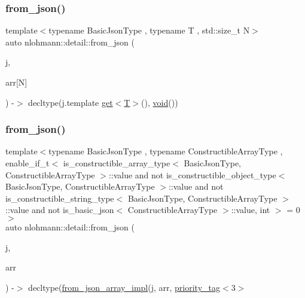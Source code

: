 \mbox{\label{namespacenlohmann_1_1detail_a7deb2db8eed6f1762373dde7a6595760}} 
\subsubsection{\texorpdfstring{from\_json()}{from\_json()}\hspace{0.1cm}{\footnotesize\ttfamily [11/18]}}
{\footnotesize\ttfamily template$<$typename Basic\+Json\+Type , typename T , std\+::size\+\_\+t N$>$ \\
auto nlohmann\+::detail\+::from\+\_\+json (\begin{DoxyParamCaption}\item[{const Basic\+Json\+Type \&}]{j,  }\item[{\mbox{\hyperlink{_keyboard_event_8h_adf1f3edb9115acb0a1e04209b7a9937b}{T}}(\&)}]{arr\mbox{[}\+N\mbox{]} }\end{DoxyParamCaption}) -\/$>$ decltype(j.\+template \mbox{\hyperlink{namespacenlohmann_1_1detail_acc422c11342b31368f610b6f96fcedc6}{get}}$<$\mbox{\hyperlink{_keyboard_event_8h_adf1f3edb9115acb0a1e04209b7a9937b}{T}}$>$(), \mbox{\hyperlink{namespacenlohmann_1_1detail_a59fca69799f6b9e366710cb9043aa77d}{void}}())
}

\mbox{\label{namespacenlohmann_1_1detail_a14d8cdf544585f1c38eab6a0820e55f7}} 
\subsubsection{\texorpdfstring{from\_json()}{from\_json()}\hspace{0.1cm}{\footnotesize\ttfamily [12/18]}}
{\footnotesize\ttfamily template$<$typename Basic\+Json\+Type , typename Constructible\+Array\+Type , enable\+\_\+if\+\_\+t$<$ is\+\_\+constructible\+\_\+array\+\_\+type$<$ Basic\+Json\+Type, Constructible\+Array\+Type $>$\+::value and not is\+\_\+constructible\+\_\+object\+\_\+type$<$ Basic\+Json\+Type, Constructible\+Array\+Type $>$\+::value and not is\+\_\+constructible\+\_\+string\+\_\+type$<$ Basic\+Json\+Type, Constructible\+Array\+Type $>$\+::value and not is\+\_\+basic\+\_\+json$<$ Constructible\+Array\+Type $>$\+::value, int $>$  = 0$>$ \\
auto nlohmann\+::detail\+::from\+\_\+json (\begin{DoxyParamCaption}\item[{const Basic\+Json\+Type \&}]{j,  }\item[{Constructible\+Array\+Type \&}]{arr }\end{DoxyParamCaption}) -\/$>$ decltype(\mbox{\hyperlink{namespacenlohmann_1_1detail_a40f7bb070a60e8ba14fffb9c117fcbd8}{from\+\_\+json\+\_\+array\+\_\+impl}}(j, arr, \mbox{\hyperlink{structnlohmann_1_1detail_1_1priority__tag}{priority\+\_\+tag}}$<$3$>$ }

